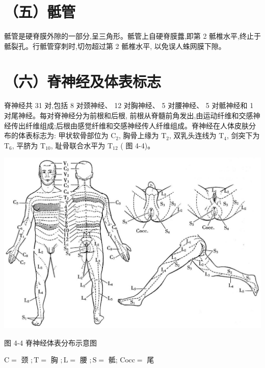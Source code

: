 \documentclass[10pt]{article}
\begin{document}
\section*{（五）骶管}
骶管是硬脊膜外隙的一部分,呈三角形。骶管上自硬脊膜虂,即第 2 骶椎水平,终止于骶裂孔。行骶管穿刺时,切勿超过第 2 骶椎水平, 以免误人蛛网膜下隙。

\section*{（六）脊神经及体表标志}
脊神经共 31 对,包括 8 对颈神经、 12 对胸神经、 5 对腰神经、 5 对骶神经和 1 对尾神经。每对脊神经分为前根和后根, 前根从脊髓前角发出,由运动纤维和交感神经传出纤维组成;后根由感觉纤维和交感神经传人纤维组成。脊神经在人体皮肤分布的体表标志为: 甲状软骨部位为 $\mathrm{C}_{2}$, 胸骨上缘为 $\mathrm{T}_{2}$, 双乳头连线为 $\mathrm{T}_{4}$, 剑突下为 $\mathrm{T}_{6}$, 平脐为 $\mathrm{T}_{10}$, 耻骨联合水平为 $\mathrm{T}_{12}$ ( 图 4-4)。

\begin{center}
\includegraphics[max width=\textwidth]{2024_07_09_002a177993bd97d1d6d7g-060}
\end{center}

图 4-4 脊神经体表分布示意图

$\mathrm{C}=$ 颈 $; \mathrm{T}=$ 胸 $; \mathrm{L}=$ 腰 $; \mathrm{S}=$ 骶; $\mathrm{Cocc}=$ 尾
\end{document}
